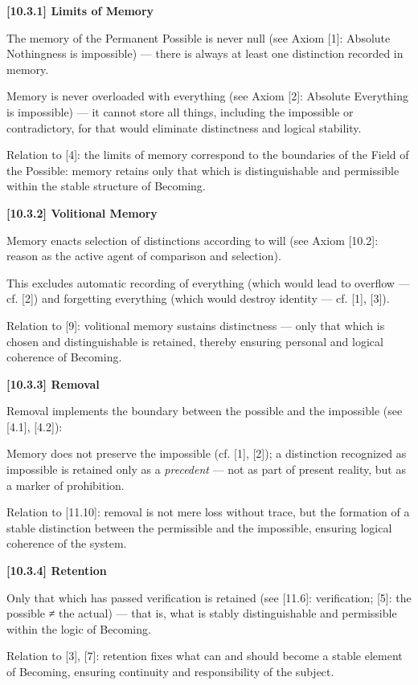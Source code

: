 \documentclass[12pt]{article}
\begin{document}
\textbf{[10.3.1] Limits of Memory}

The memory of the Permanent Possible is never null (see Axiom [1]: Absolute Nothingness is impossible) — there is always at least one distinction recorded in memory.

Memory is never overloaded with everything (see Axiom [2]: Absolute Everything is impossible) — it cannot store all things, including the impossible or contradictory, for that would eliminate distinctness and logical stability.

Relation to [4]: the limits of memory correspond to the boundaries of the Field of the Possible: memory retains only that which is distinguishable and permissible within the stable structure of Becoming.

\bigskip
\textbf{[10.3.2] Volitional Memory}

Memory enacts selection of distinctions according to will (see Axiom [10.2]: reason as the active agent of comparison and selection).

This excludes automatic recording of everything (which would lead to overflow — cf. [2]) and forgetting everything (which would destroy identity — cf. [1], [3]).

Relation to [9]: volitional memory sustains distinctness — only that which is chosen and distinguishable is retained, thereby ensuring personal and logical coherence of Becoming.

\bigskip
\textbf{[10.3.3] Removal}

Removal implements the boundary between the possible and the impossible (see [4.1], [4.2]):

Memory does not preserve the impossible (cf. [1], [2]); a distinction recognized as impossible is retained only as a \textit{precedent} — not as part of present reality, but as a marker of prohibition.

Relation to [11.10]: removal is not mere loss without trace, but the formation of a stable distinction between the permissible and the impossible, ensuring logical coherence of the system.

\bigskip
\textbf{[10.3.4] Retention}

Only that which has passed verification is retained (see [11.6]: verification; [5]: the possible ≠ the actual) — that is, what is stably distinguishable and permissible within the logic of Becoming.

Relation to [3], [7]: retention fixes what can and should become a stable element of Becoming, ensuring continuity and responsibility of the subject.
\end{document}
